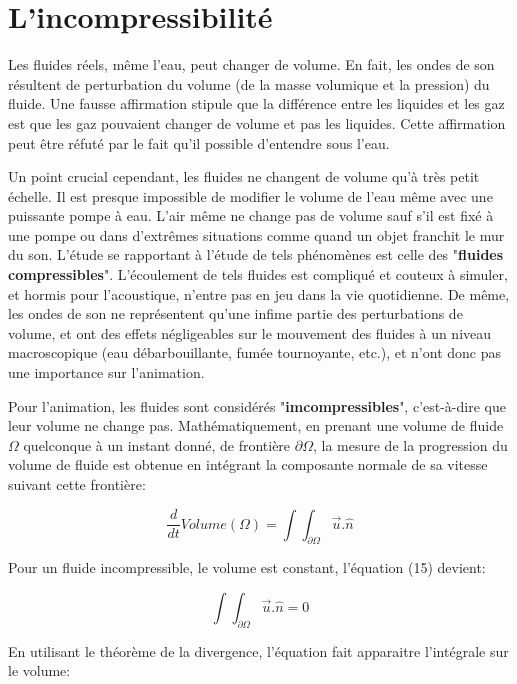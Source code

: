 \documentclass[11pt]{report}
\begin{document}
\section{L'incompressibilité}

Les fluides réels, même l'eau, peut changer de volume. En fait, les ondes de son résultent de perturbation du volume (de la masse volumique et la pression) du fluide. Une fausse affirmation stipule que la différence entre les liquides et les gaz est que les gaz pouvaient changer de volume et pas les liquides. Cette affirmation peut être réfuté par le fait qu'il possible d'entendre sous l'eau.

Un point crucial cependant, les fluides ne changent de volume qu'à très petit échelle. Il est presque impossible de modifier le volume de l'eau même avec une puissante pompe à eau. L'air même ne change pas de volume sauf s'il est fixé à une pompe ou dans d'extrêmes situations comme quand un objet franchit le mur du son. L'étude se rapportant à l'étude de tels phénomènes est celle des "\textbf{fluides compressibles}". L'écoulement de tels fluides est compliqué et couteux à simuler, et hormis pour l'acoustique, n'entre pas en jeu dans la vie quotidienne. De même, les ondes de son ne représentent qu'une infime partie des perturbations de volume, et ont des effets négligeables sur le mouvement des fluides à un niveau macroscopique (eau débarbouillante, fumée tournoyante, etc.), et n'ont donc pas une importance sur l'animation.

Pour l'animation, les fluides sont considérés "\textbf{imcompressibles}", c'est-à-dire que leur volume ne change pas.
Mathématiquement, en prenant une volume de fluide $ \Omega $ quelconque à un instant donné, de frontière $ \partial\Omega $, la mesure de la progression du volume de fluide est obtenue en intégrant la composante normale de sa vitesse suivant cette frontière:

\begin{equation}
\frac{d}{dt} Volume(\Omega) = \int \!\!\!\! \int_{\partial \Omega} \overrightarrow{u} . \hat{n}
\end{equation}

Pour un fluide incompressible, le volume est constant, l'équation (15) devient:

\begin{equation}
\int \!\!\!\! \int_{\partial \Omega} \overrightarrow{u} . \hat{n} = 0
\end{equation}

En utilisant le théorème de la divergence, l'équation fait apparaitre l'intégrale sur le volume:
\end{document}
